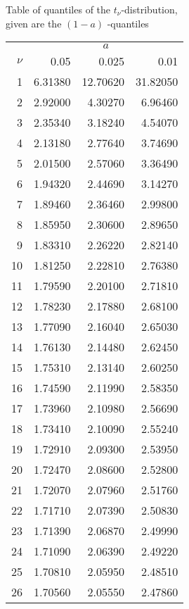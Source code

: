 \documentclass{article}
\begin{document}
	\newpage 
	\begin{minipage}[t]{6cm}
		Table of quantiles of the $t_{\nu }$-distribution,\\ given are the $(1-a)$%
		-quantiles
		
		\begin{center}
			\begin{tabular}{|r|rrr|}
				\hline
				& \multicolumn{3}{|c|}{$a$} \\ 
				$\nu$ & 0.05 & 0.025 & 0.01 \\ \hline
				1 & 6.31380 & 12.70620 & 31.82050 \\
				2 & 2.92000 & 4.30270 & 6.96460 \\
				3 & 2.35340 & 3.18240 & 4.54070 \\
				4 & 2.13180 & 2.77640 & 3.74690 \\
				5 & 2.01500 & 2.57060 & 3.36490 \\
				6 & 1.94320 & 2.44690 & 3.14270 \\
				7 & 1.89460 & 2.36460 & 2.99800 \\
				8 & 1.85950 & 2.30600 & 2.89650 \\
				9 & 1.83310 & 2.26220 & 2.82140 \\
				10 & 1.81250 & 2.22810 & 2.76380 \\
				11 & 1.79590 & 2.20100 & 2.71810 \\
				12 & 1.78230 & 2.17880 & 2.68100 \\
				13 & 1.77090 & 2.16040 & 2.65030 \\
				14 & 1.76130 & 2.14480 & 2.62450 \\
				15 & 1.75310 & 2.13140 & 2.60250 \\
				16 & 1.74590 & 2.11990 & 2.58350 \\
				17 & 1.73960 & 2.10980 & 2.56690 \\
				18 & 1.73410 & 2.10090 & 2.55240 \\
				19 & 1.72910 & 2.09300 & 2.53950 \\
				20 & 1.72470 & 2.08600 & 2.52800 \\
				21 & 1.72070 & 2.07960 & 2.51760 \\
				22 & 1.71710 & 2.07390 & 2.50830 \\
				23 & 1.71390 & 2.06870 & 2.49990 \\
				24 & 1.71090 & 2.06390 & 2.49220 \\
				25 & 1.70810 & 2.05950 & 2.48510 \\
				26 & 1.70560 & 2.05550 & 2.47860 \\

\end{tabular}
\end{center}
\end{minipage}
\end{document}
